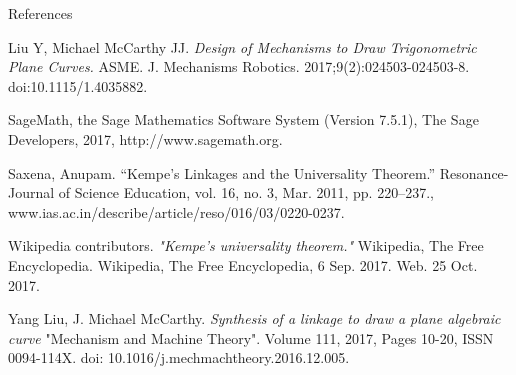 \documentclass{beamer}
\begin{document}
\begin{frame}{}
\begin{columns}[t]
\begin{column}{0.245\linewidth}
\begin{block}{References}
\begin{thebibliography}{99}
Liu Y, Michael McCarthy JJ.\emph{ Design of Mechanisms to Draw Trigonometric Plane Curves.} ASME. J. Mechanisms Robotics. 2017;9(2):024503-024503-8. doi:10.1115/1.4035882.  

SageMath, the Sage Mathematics Software System (Version 7.5.1),
   The Sage Developers, 2017, http://www.sagemath.org.
   
Saxena, Anupam. “Kempe's Linkages and the Universality Theorem.” Resonance-Journal of Science Education, vol. 16, no. 3, Mar. 2011, pp. 220–237., www.ias.ac.in/describe/article/reso/016/03/0220-0237.

Wikipedia contributors.\emph{ "Kempe's universality theorem."} Wikipedia, The Free Encyclopedia. Wikipedia, The Free Encyclopedia, 6 Sep. 2017. Web. 25 Oct. 2017.

Yang Liu, J. Michael McCarthy. \emph{ Synthesis of a linkage to draw a plane algebraic curve} "Mechanism and Machine Theory". Volume 111, 2017, Pages 10-20, ISSN 0094-114X. doi: 10.1016/j.mechmachtheory.2016.12.005.

\end{thebibliography}
\end{block}
\end{column}%

\end{columns}
\end{frame}
\end{document}
